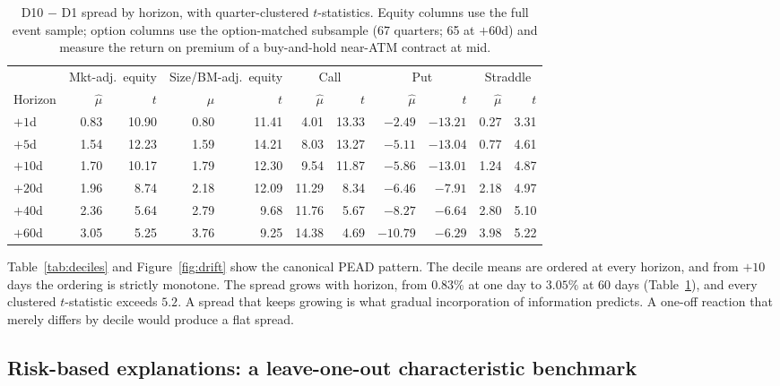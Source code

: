 \documentclass[11pt]{article}
\theoremstyle{definition}
\newcommand{\1}{\mathbf{1}}
\begin{document}
\begin{table}[t]\centering\small
\caption{D10 $-$ D1 spread by horizon, with quarter-clustered $t$-statistics. Equity columns
use the full event sample; option columns use the option-matched subsample (67 quarters;
65 at $+60$d) and measure the return on premium of a buy-and-hold near-ATM contract at
mid.}\label{tab:spreads}
\begin{tabular}{l rr rr rr rr rr}
\toprule
 & \multicolumn{2}{c}{Mkt-adj.\ equity} & \multicolumn{2}{c}{Size/BM-adj.\ equity} & \multicolumn{2}{c}{Call} & \multicolumn{2}{c}{Put} & \multicolumn{2}{c}{Straddle}\\
\cmidrule(lr){2-3}\cmidrule(lr){4-5}\cmidrule(lr){6-7}\cmidrule(lr){8-9}\cmidrule(lr){10-11}
Horizon & $\hat\mu$ & $t$ & $\hat\mu$ & $t$ & $\hat\mu$ & $t$ & $\hat\mu$ & $t$ & $\hat\mu$ & $t$\\
\midrule
$+1$d  & 0.83 & 10.90 & 0.80 & 11.41 & 4.01 & 13.33 & $-2.49$ & $-13.21$ & 0.27 & 3.31\\
$+5$d  & 1.54 & 12.23 & 1.59 & 14.21 & 8.03 & 13.27 & $-5.11$ & $-13.04$ & 0.77 & 4.61\\
$+10$d & 1.70 & 10.17 & 1.79 & 12.30 & 9.54 & 11.87 & $-5.86$ & $-13.01$ & 1.24 & 4.87\\
$+20$d & 1.96 & 8.74  & 2.18 & 12.09 & 11.29 & 8.34 & $-6.46$ & $-7.91$ & 2.18 & 4.97\\
$+40$d & 2.36 & 5.64  & 2.79 & 9.68  & 11.76 & 5.67 & $-8.27$ & $-6.64$ & 2.80 & 5.10\\
$+60$d & 3.05 & 5.25  & 3.76 & 9.25  & 14.38 & 4.69 & $-10.79$ & $-6.29$ & 3.98 & 5.22\\
\bottomrule
\end{tabular}
\end{table}

Table~\ref{tab:deciles} and Figure~\ref{fig:drift} show the canonical PEAD pattern. The
decile means are ordered at every horizon, and from $+10$ days the ordering is strictly
monotone. The spread grows with horizon, from $0.83\%$ at one day to $3.05\%$ at 60 days
(Table~\ref{tab:spreads}), and every clustered $t$-statistic exceeds $5.2$. A spread that
keeps growing is what gradual incorporation of information predicts. A one-off reaction
that merely differs by decile would produce a flat spread.

\subsection{Risk-based explanations: a leave-one-out characteristic benchmark}
\end{document}
